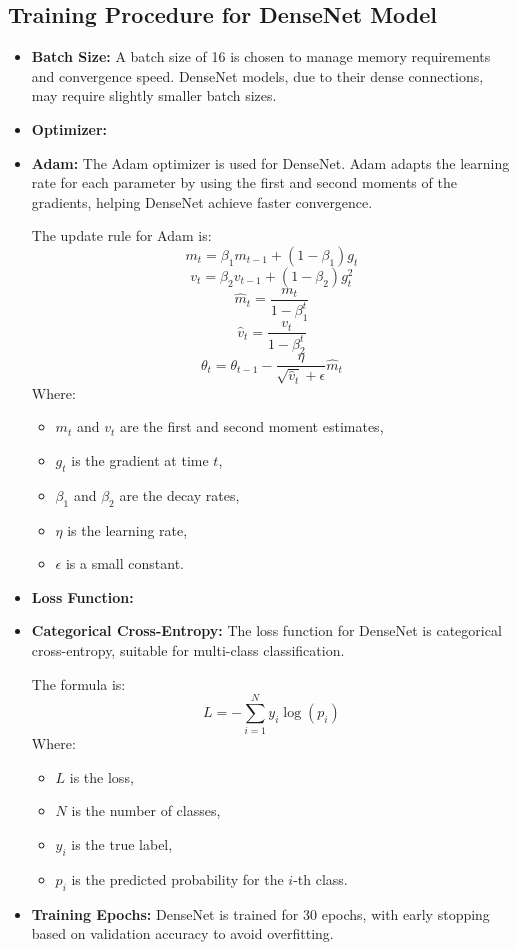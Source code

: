 \documentclass{article}
\begin{document}
\subsection{Training Procedure for DenseNet Model}

\begin{itemize}
    \item \textbf{Batch Size:} A batch size of 16 is chosen to manage memory requirements and convergence speed. DenseNet models, due to their dense connections, may require slightly smaller batch sizes.
    \item \textbf{Optimizer:} \item \textbf{Adam:} The Adam optimizer is used for DenseNet. Adam adapts the learning rate for each parameter by using the first and second moments of the gradients, helping DenseNet achieve faster convergence.

    The update rule for Adam is:
    \[
    m_t = \beta_1 m_{t-1} + (1 - \beta_1) g_t
    \]
    \[
    v_t = \beta_2 v_{t-1} + (1 - \beta_2) g_t^2
    \]
    \[
    \hat{m}_t = \frac{m_t}{1 - \beta_1^t}
    \]
    \[
    \hat{v}_t = \frac{v_t}{1 - \beta_2^t}
    \]
    \[
    \theta_t = \theta_{t-1} - \frac{\eta}{\sqrt{\hat{v}_t} + \epsilon} \hat{m}_t
    \]
    Where:
    \begin{itemize}
        \item \( m_t \) and \( v_t \) are the first and second moment estimates,
        \item \( g_t \) is the gradient at time \( t \),
        \item \( \beta_1 \) and \( \beta_2 \) are the decay rates,
        \item \( \eta \) is the learning rate,
        \item \( \epsilon \) is a small constant.
    \end{itemize}
    \item \textbf{Loss Function:} \item \textbf{Categorical Cross-Entropy:} The loss function for DenseNet is categorical cross-entropy, suitable for multi-class classification.

    The formula is:
    \[
    L = - \sum_{i=1}^{N} y_i \log(p_i)
    \]
    Where:
    \begin{itemize}
        \item \( L \) is the loss,
        \item \( N \) is the number of classes,
        \item \( y_i \) is the true label,
        \item \( p_i \) is the predicted probability for the \( i \)-th class.
    \end{itemize}
    \item \textbf{Training Epochs:} DenseNet is trained for 30 epochs, with early stopping based on validation accuracy to avoid overfitting.
\end{itemize}
\end{document}
